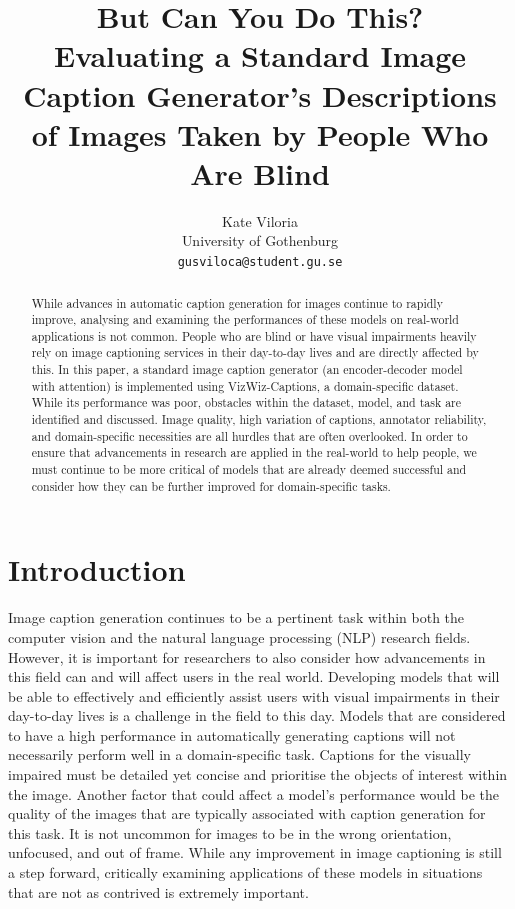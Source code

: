 \documentclass[11pt,a4paper]{article}
\title{But Can You Do This? \\ Evaluating a Standard Image Caption Generator's Descriptions of Images Taken by People Who Are Blind}
\author{Kate Viloria \\
  University of Gothenburg \\ 
  \texttt{gusviloca@student.gu.se}}
\date{}
\begin{document}
\maketitle
\begin{abstract}
While advances in automatic caption generation for images continue to rapidly improve, analysing and examining the performances of these models on real-world applications is not common. People who are blind or have visual impairments heavily rely on image captioning services in their day-to-day lives and are directly affected by this. In this paper, a standard image caption generator (an encoder-decoder model with attention) is implemented using VizWiz-Captions, a domain-specific dataset. While its performance was poor, obstacles within the dataset, model, and task are identified and discussed. Image quality, high variation of captions, annotator reliability, and domain-specific necessities are all hurdles that are often overlooked. In order to ensure that advancements in research are applied in the real-world to help people, we must continue to be more critical of models that are already deemed successful and consider how they can be further improved for domain-specific tasks. 
\end{abstract}

\section{Introduction}
\label{sec:intro}
Image caption generation continues to be a pertinent task within both the computer vision and the natural language processing (NLP) research fields. However, it is important for researchers to also consider how advancements in this field can and will affect users in the real world. Developing models that will be able to effectively and efficiently assist users with visual impairments in their day-to-day lives is a challenge in the field to this day. Models that are considered to have a high performance in automatically generating captions will not necessarily perform well in a domain-specific task. Captions for the visually impaired must be detailed yet concise and prioritise the objects of interest within the image. Another factor that could affect a model’s performance would be the quality of the images that are typically associated with caption generation for this task. It is not uncommon for images to be in the wrong orientation, unfocused, and out of frame. While any improvement in image captioning is still a step forward, critically examining applications of these models in situations that are not as contrived is extremely important. 
\end{document}
